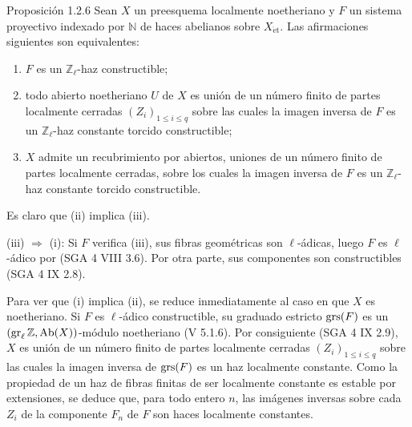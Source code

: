 \begin{statement}{Proposición 1.2.6}
Sean \(X\) un preesquema localmente noetheriano y \(F\) un sistema proyectivo indexado por \(\mathbb N\) de haces abelianos sobre \(X_{\mathrm{\acute et}}\). Las afirmaciones siguientes son equivalentes:
\begin{enumerate}[label=(\roman*)]
\item \(F\) es un \(\mathbb Z_\ell\)-haz constructible;
\item todo abierto noetheriano \(U\) de \(X\) es unión de un número finito de partes localmente cerradas \((Z_i)_{1\le i\le q}\) sobre las cuales la imagen inversa de \(F\) es un \(\mathbb Z_\ell\)-haz constante torcido constructible;
\item \(X\) admite un recubrimiento por abiertos, uniones de un número finito de partes localmente cerradas, sobre los cuales la imagen inversa de \(F\) es un \(\mathbb Z_\ell\)-haz constante torcido constructible.
\end{enumerate}
\end{statement}

\begin{prooftext}[Demostración]
Es claro que (ii) implica (iii).

(iii) \(\Longrightarrow\) (i): Si \(F\) verifica (iii), sus fibras geométricas son \(\ell\)-ádicas, luego \(F\) es \(\ell\)-ádico por (SGA 4 VIII 3.6). Por otra parte, sus componentes son constructibles (SGA 4 IX 2.8).

Para ver que (i) implica (ii), se reduce inmediatamente al caso en que \(X\) es noetheriano. Si \(F\) es \(\ell\)-ádico constructible, su graduado estricto \(\operatorname{grs}(F)\) es un \((\operatorname{gr}_\ell\mathbb Z,\operatorname{Ab}(X))\)-módulo noetheriano (V 5.1.6). Por consiguiente (SGA 4 IX 2.9), \(X\) es unión de un número finito de partes localmente cerradas \((Z_i)_{1\le i\le q}\) sobre las cuales la imagen inversa de \(\operatorname{grs}(F)\) es un haz localmente constante. Como la propiedad de un haz de fibras finitas de ser localmente constante es estable por extensiones, se deduce que, para todo entero \(n\), las imágenes inversas sobre cada \(Z_i\) de la componente \(F_n\) de \(F\) son haces localmente constantes.
\end{prooftext}
